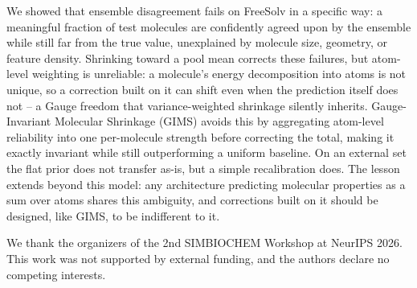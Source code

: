 \documentclass{article}
\begin{document}
We showed that ensemble disagreement fails on FreeSolv in a specific way:
a meaningful fraction of test molecules are confidently agreed upon by the
ensemble while still far from the true value, unexplained by molecule size,
geometry, or feature density. Shrinking toward a pool mean corrects these
failures, but atom-level weighting is unreliable: a molecule's energy decomposition into atoms is not unique, so a correction built on it can shift even when the prediction itself does not -- a Gauge freedom that variance-weighted shrinkage silently inherits. Gauge-Invariant Molecular
Shrinkage (GIMS) avoids this by aggregating atom-level reliability into
one per-molecule strength before correcting the total, making it exactly
invariant while still outperforming a uniform baseline. On an external set
the flat prior does not transfer as-is, but a simple recalibration does.
The lesson extends beyond this model: any architecture predicting
molecular properties as a sum over atoms shares this ambiguity, and
corrections built on it should be designed, like GIMS, to be indifferent
to it.

\begin{ack}
We thank the organizers of the 2nd SIMBIOCHEM Workshop at NeurIPS 2026. This
work was not supported by external funding, and the authors declare no
competing interests.
\end{ack}
\end{document}
